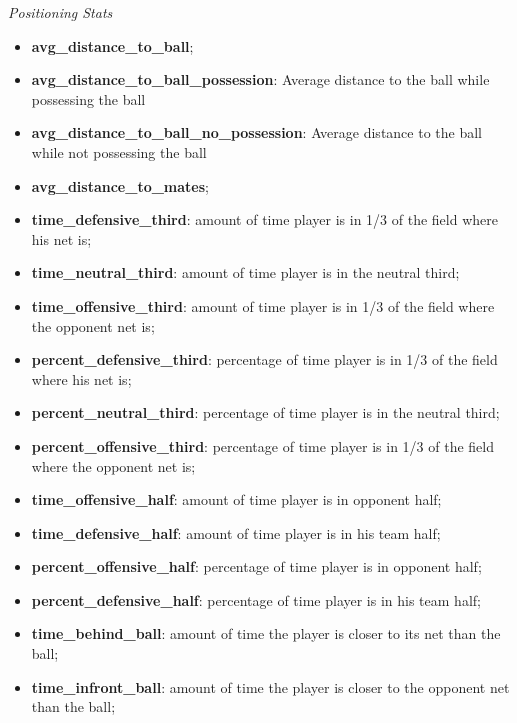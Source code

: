 \begin{center}
    \textit{Positioning Stats}
\end{center}
\begin{itemize}
    \item \textbf{avg\_distance\_to\_ball};
    \item \textbf{avg\_distance\_to\_ball\_possession}: Average distance to the ball while possessing the ball
    \item \textbf{avg\_distance\_to\_ball\_no\_possession}: Average distance to the ball while not possessing the ball
    \item \textbf{avg\_distance\_to\_mates};
    \item \textbf{time\_defensive\_third}: amount of time player is in 1/3 of the field where his net is;
    \item \textbf{time\_neutral\_third}: amount of time player is in the neutral third;
    \item \textbf{time\_offensive\_third}: amount of time player is in 1/3 of the field where the opponent net is;
    \item \textbf{percent\_defensive\_third}: percentage of time player is in 1/3 of the field where his net is;
    \item \textbf{percent\_neutral\_third}: percentage of time player is in the neutral third;
    \item \textbf{percent\_offensive\_third}: percentage of time player is in 1/3 of the field where the opponent net is;
    \item \textbf{time\_offensive\_half}: amount of time player is in opponent half; \\
    \item \textbf{time\_defensive\_half}: amount of time player is in his team half; \\
    \item \textbf{percent\_offensive\_half}: percentage of time player is in opponent half; \\
    \item \textbf{percent\_defensive\_half}: percentage of time player is in his team half; \\
    \item \textbf{time\_behind\_ball}: amount of time the player is closer to its net than the ball; \\
    \item \textbf{time\_infront\_ball}: amount of time the player is closer to the opponent net than the ball; \\

\end{itemize}
